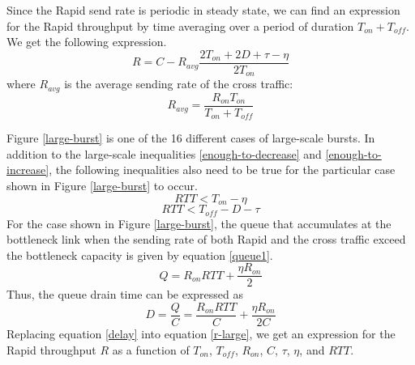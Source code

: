   Since the Rapid send rate is periodic in steady state, we can find an 
  expression for the Rapid throughput by time averaging over a period of 
  duration $T_{on} + T_{off}$. We get the following expression.
  \begin{equation}
    R = C - R_{avg} \frac{2 T_{on} + 2 D + \tau - \eta}{2 T_{on}}
    \label{r-large}
  \end{equation}
  where $R_{avg}$ is the average sending rate of the cross traffic:
  \begin{equation}
    R_{avg} = \frac{R_{on} T_{on}}{T_{on} + T_{off}}
    \label{ravg}
  \end{equation}

  Figure \ref{large-burst} is one of the 16 different cases of large-scale 
  bursts. In addition to the large-scale inequalities \ref{enough-to-decrease} 
  and \ref{enough-to-increase}, the following inequalities also need to be true 
  for the particular case shown in Figure \ref{large-burst} to occur.
  \begin{equation}
    RTT < T_{on} - \eta
  \end{equation}
  \begin{equation}
    RTT < T_{off} - D - \tau
  \end{equation}
  For the case shown in Figure \ref{large-burst}, the queue that accumulates 
  at the bottleneck link when the sending rate of both Rapid and the cross 
  traffic exceed the bottleneck capacity is given by equation 
  \eqref{queue1}.
  \begin{equation}
    Q = R_{on} RTT + \frac{\eta R_{on}}{2}
    \label{queue1}
  \end{equation}
  Thus, the queue drain time can be expressed as
  \begin{equation}
    D = \frac{Q}{C} = \frac{R_{on} RTT}{C} + \frac{\eta R_{on}}{2C}
    \label{delay}
  \end{equation}
  Replacing equation \eqref{delay} into equation \eqref{r-large}, we get an 
  expression for the Rapid throughput $R$ as a function of $T_{on}$, 
  $T_{off}$, $R_{on}$, $C$, $\tau$, $\eta$, and $RTT$.
